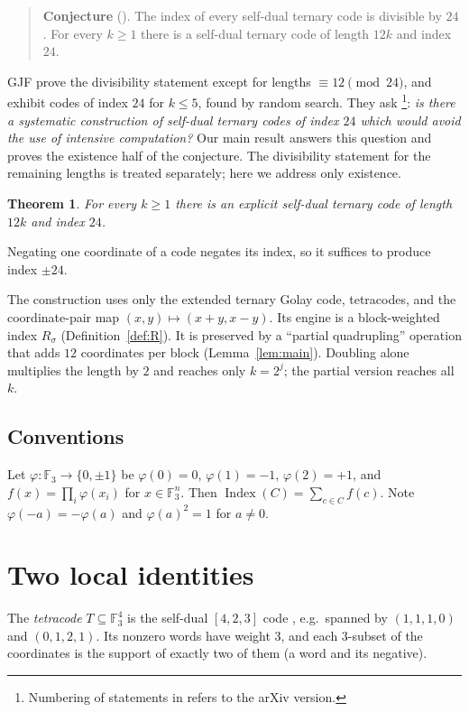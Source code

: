 \documentclass[11pt]{amsart}
\newtheorem{theorem}{Theorem}
\theoremstyle{definition}
\newcommand{\F}{\mathbb{F}_3}
\newcommand{\Index}{\operatorname{Index}}
\begin{document}
\begin{quote}
\textbf{Conjecture} (\cite[Conj.~1.4]{GJF}). The index of every self-dual ternary code is
divisible by $24$. For every $k\ge1$ there is a self-dual ternary code of length $12k$ and
index $24$.
\end{quote}

GJF prove the divisibility statement except for lengths $\equiv 12\pmod{24}$, and exhibit codes of
index $24$ for $k\le 5$, found by random search. They ask
\cite[Question~0.1]{GJF}\footnote{Numbering of statements in \cite{GJF} refers to the arXiv version.}:
\emph{is there a systematic construction of self-dual ternary codes of
index $24$ which would avoid the use of intensive computation?}
Our main result answers this question and proves the existence half of the conjecture. The
divisibility statement for the remaining lengths is treated separately; here we address only
existence.

\begin{theorem}\label{thm:main}
For every $k\ge1$ there is an explicit self-dual ternary code of length $12k$ and index $24$.
\end{theorem}

Negating one coordinate of a code negates its index, so it suffices to produce index $\pm24$.

The construction uses only the extended ternary Golay code, tetracodes, and the coordinate-pair
map $(x,y)\mapsto(x+y,x-y)$. Its engine is a block-weighted index $R_\sigma$
(Definition~\ref{def:R}). It is preserved by a ``partial quadrupling'' operation that adds $12$
coordinates per block (Lemma~\ref{lem:main}). Doubling alone multiplies the length by $2$ and
reaches only $k=2^j$; the partial version reaches all $k$.

\subsection*{Conventions}
Let $\varphi\colon\F\to\{0,\pm1\}$ be $\varphi(0)=0$, $\varphi(1)=-1$, $\varphi(2)=+1$, and
$f(x)=\prod_i\varphi(x_i)$ for $x\in\F^n$. Then $\Index(C)=\sum_{c\in C}f(c)$. Note
$\varphi(-a)=-\varphi(a)$ and $\varphi(a)^2=1$ for $a\neq0$.

\section{Two local identities}

The \emph{tetracode} $T\subseteq\F^4$ is the self-dual $[4,2,3]$ code \cite{CS}, e.g.\ spanned by
$(1,1,1,0)$ and $(0,1,2,1)$. Its nonzero words have weight $3$, and each $3$-subset of the
coordinates is the support of exactly two of them (a word and its negative).
\end{document}
